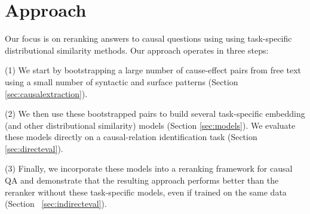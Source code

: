 
%
\section{Approach}
\label{sec:approach}

Our focus is on reranking answers to causal questions using using task-specific distributional similarity methods.
%
Our approach operates in three steps:

{\flushleft (1)} We start by bootstrapping a large number of cause-effect pairs from free text using a small number of syntactic and surface patterns (Section \ref{sec:causalextraction}).

{\flushleft (2)} We then use these bootstrapped pairs to build several task-specific embedding (and other distributional similarity) models (Section \ref{sec:models}). We evaluate these models directly on a causal-relation identification task (Section \ref{sec:directeval}).  

{\flushleft (3)} Finally, we incorporate these models into a reranking framework for causal QA and demonstrate that the resulting approach performs better than the reranker without these task-specific models, even if trained on the same data (Section ~\ref{sec:indirecteval}).  



